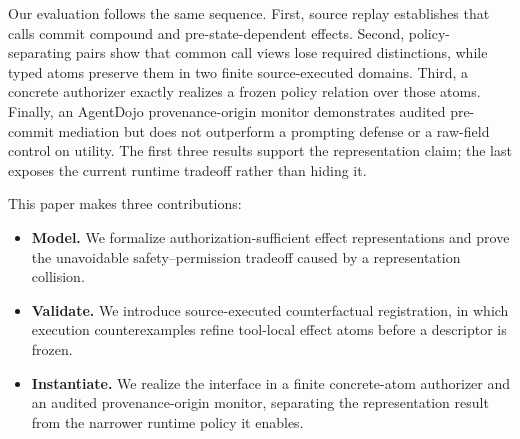 Our evaluation follows the same sequence.  First, source replay establishes
that calls commit compound and pre-state-dependent effects.  Second,
policy-separating pairs show that common call views lose required distinctions,
while typed atoms preserve them in two finite source-executed domains.  Third,
a concrete authorizer exactly realizes a frozen policy relation over those
atoms.  Finally, an AgentDojo provenance-origin monitor demonstrates audited
pre-commit mediation but does not outperform a prompting defense or a raw-field
control on utility.  The first three results support the representation claim;
the last exposes the current runtime tradeoff rather than hiding it.

This paper makes three contributions:
\begin{itemize}[leftmargin=*]
  \item \textbf{Model.} We formalize authorization-sufficient effect
  representations and prove the unavoidable safety--permission tradeoff
  caused by a representation collision.
  \item \textbf{Validate.} We introduce source-executed counterfactual
  registration, in which execution counterexamples refine tool-local effect
  atoms before a descriptor is frozen.
  \item \textbf{Instantiate.} We realize the interface in a finite
  concrete-atom authorizer and an audited provenance-origin monitor, separating
  the representation result from the narrower runtime policy it enables.
\end{itemize}
